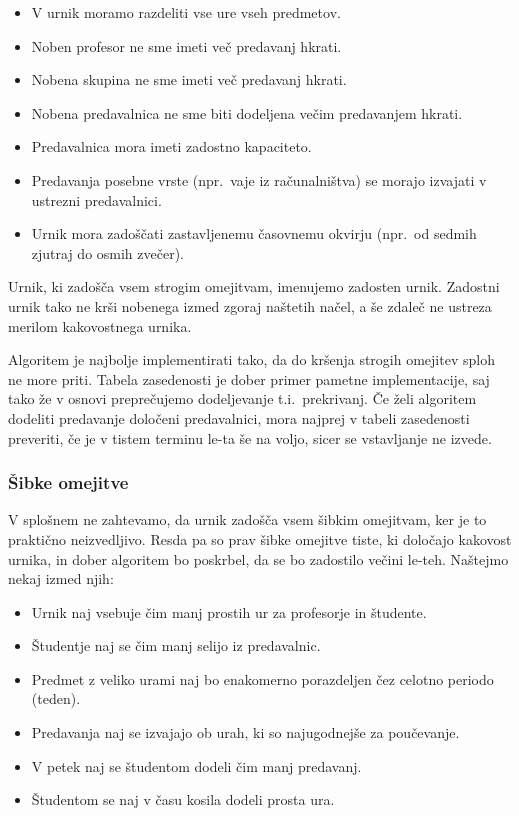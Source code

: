 \documentclass[a4paper,10pt]{article}
\begin{document}
\begin{itemize}
   \item V urnik moramo razdeliti vse ure vseh predmetov.
   \item Noben profesor ne sme imeti več predavanj hkrati.
   \item Nobena skupina ne sme imeti več predavanj hkrati.
   \item Nobena predavalnica ne sme biti dodeljena večim predavanjem hkrati.
   \item Predavalnica mora imeti zadostno kapaciteto.
   \item Predavanja posebne vrste (npr.~vaje iz računalništva) se morajo izvajati v ustrezni predavalnici.
   \item Urnik mora zadoščati zastavljenemu časovnemu okvirju (npr.~od sedmih zjutraj do osmih zvečer).
\end{itemize}


\noindent
Urnik, ki zadošča vsem strogim omejitvam, imenujemo zadosten urnik. Zadostni urnik tako ne
krši nobenega izmed zgoraj naštetih načel, a še zdaleč ne ustreza merilom kakovostnega urnika.

Algoritem je najbolje implementirati tako, da do kršenja strogih omejitev sploh ne more priti.
Tabela zasedenosti je dober primer pametne implementacije, saj tako že v osnovi  preprečujemo
dodeljevanje t.i.~prekrivanj. Če želi algoritem dodeliti predavanje določeni predavalnici,
mora najprej v tabeli zasedenosti preveriti, če je v tistem terminu le-ta še na voljo,
sicer se vstavljanje ne izvede.

\subsubsection{Šibke omejitve}

V splošnem ne zahtevamo, da urnik zadošča vsem šibkim omejitvam, ker je to praktično neizvedljivo.
Resda pa so prav šibke omejitve tiste, ki določajo kakovost urnika, in dober algoritem bo
poskrbel, da se bo zadostilo večini le-teh. Naštejmo nekaj izmed njih:


\begin{itemize}
   \item Urnik naj vsebuje čim manj prostih ur za profesorje in študente.
   \item Študentje naj se čim manj selijo iz predavalnic.
   \item Predmet z veliko urami naj bo enakomerno porazdeljen čez celotno periodo (teden).
   \item Predavanja naj se izvajajo ob urah, ki so najugodnejše za poučevanje.
   \item V petek naj se študentom dodeli čim manj predavanj.
   \item Študentom se naj v času kosila dodeli prosta ura.
\end{itemize}
\end{document}
